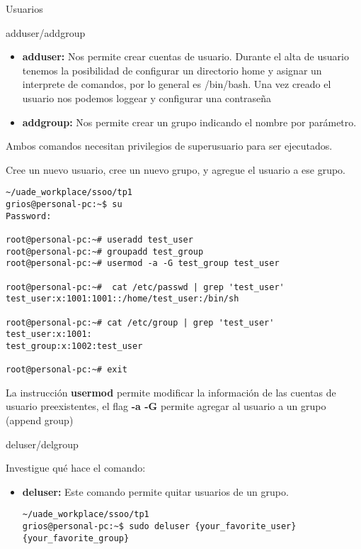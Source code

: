 \begin{section}{Usuarios}
\begin{subsection}{adduser/addgroup}
\begin{itemize}

\item \textbf{adduser:}
	Nos permite crear cuentas de usuario. Durante el alta de usuario tenemos la posibilidad de configurar un directorio home y asignar un interprete de comandos, por lo general es /bin/bash. Una vez creado el usuario nos podemos loggear y configurar una contraseña

\item \textbf{addgroup:}
	Nos permite crear un grupo indicando el nombre por parámetro.
\end{itemize}

Ambos comandos necesitan privilegios de superusuario para ser ejecutados. \\

\begin{quoting}
Cree un nuevo usuario, cree un nuevo grupo, y agregue el usuario a ese grupo.
\end{quoting}


\begin{lstlisting}[style=Ubuntu]
~/uade_workplace/ssoo/tp1
grios@personal-pc:~$ su
Password: 

root@personal-pc:~# useradd test_user
root@personal-pc:~# groupadd test_group
root@personal-pc:~# usermod -a -G test_group test_user

root@personal-pc:~#  cat /etc/passwd | grep 'test_user'
test_user:x:1001:1001::/home/test_user:/bin/sh

root@personal-pc:~# cat /etc/group | grep 'test_user'
test_user:x:1001:
test_group:x:1002:test_user

root@personal-pc:~# exit
\end{lstlisting}

La instrucción \textbf{usermod} permite modificar la información de las cuentas de usuario preexistentes, el flag \textbf{-a -G} permite agregar al usuario a un grupo (append group)\\

\end{subsection}

\begin{subsection}{deluser/delgroup}
\begin{quoting}
Investigue qué hace el comando:
\end{quoting}

\begin{itemize}
\item \textbf{deluser:}
Este comando permite quitar usuarios de un grupo.
\begin{lstlisting}[style=Ubuntu]
~/uade_workplace/ssoo/tp1
grios@personal-pc:~$ sudo deluser {your_favorite_user} {your_favorite_group} 
\end{lstlisting}


\end{itemize}
\end{subsection}
\end{section}
